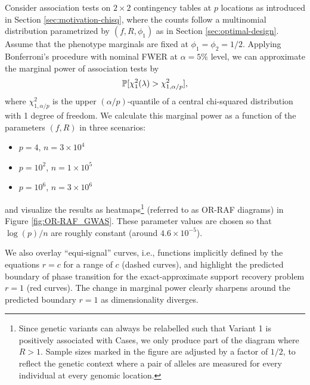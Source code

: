 \begin{example}
\label{exmp:OR-RAF_phase_transition}
Consider association tests on $2\times2$ contingency tables at $p$ locations as introduced in Section \ref{sec:motivation-chisq}, where the counts follow 
a multinomial distribution
parametrized by $(f, R, \phi_1)$ as in Section \ref{sec:optimal-design}.
Assume that the phenotype marginals are fixed at $\phi_1 = \phi_2 = 1/2$.
Applying Bonferroni's procedure with nominal FWER at $\alpha=5\%$ level, we can approximate the marginal power of association tests by
\begin{equation} \label{eq:power-approximation}
    \P[\chi^2_{1}(\lambda)>\chi^2_{1,\alpha/p}],
\end{equation}
where $\chi^2_{1,\alpha/p}$ is the upper $(\alpha/p)$-quantile of a central chi-squared distribution with 1 degree of freedom.
We calculate this marginal power as a function of the parameters $(f,R)$ in three scenarios:
\begin{itemize}
    \item $p=4$, $n=3\times10^4$ 
    \item $p=10^2$, $n=1\times10^5$
    \item $p=10^6$, $n=3\times10^6$
\end{itemize}
and visualize the results as heatmaps\footnote{Since genetic variants can always be relabelled such that Variant 1 is positively associated with Cases, we only produce part of the diagram where $R>1$.
Sample sizes marked in the figure are adjusted by a factor of $1/2$, to reflect the genetic context where a pair of alleles are measured for every individual at every genomic location.} (referred to as OR-RAF diagrams) in Figure \ref{fig:OR-RAF_GWAS}.
These parameter values are chosen so that $\log(p)/n$ are roughly constant (around $4.6\times10^{-5}$).

We also overlay ``equi-signal'' curves, i.e., functions implicitly defined by the equations $r=c$ for a range of $c$ (dashed curves), and highlight the predicted boundary of phase transition for the exact-approximate support recovery problem $r=1$ (red curves).
The change in marginal power clearly sharpens around the predicted boundary $r=1$ as dimensionality diverges.
\end{example}




